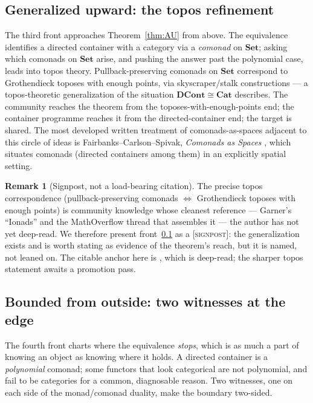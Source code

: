 \documentclass[11pt]{amsart}
\theoremstyle{plain}
\theoremstyle{definition}
\newtheorem{remark}[theorem]{Remark}
\newcommand{\Set}{\mathbf{Set}}
\newcommand{\Cat}{\mathbf{Cat}}
\newcommand{\DCont}{\mathbf{DCont}}
\newcommand{\iso}{\cong}
\newcommand{\gSignpost}{\textsc{[signpost]}}
\begin{document}
\subsection{Generalized upward: the topos refinement}\label{sub:up}

The third front approaches Theorem~\ref{thm:AU} from above. The equivalence identifies a
directed container with a category via a \emph{comonad} on $\Set$; asking which comonads on
$\Set$ arise, and pushing the answer past the polynomial case, leads into topos theory.
Pullback-preserving comonads on $\Set$ correspond to Grothendieck toposes with enough points,
via skyscraper/stalk constructions --- a topos-theoretic generalization of the situation
$\DCont\iso\Cat$ describes. The community reaches the theorem from the toposes-with-enough-points
end; the container programme reaches it from the directed-container end; the target is shared.
The most developed written treatment of comonads-as-spaces adjacent to this circle of ideas is
Fairbanks--Carlson--Spivak, \emph{Comonads as Spaces} \cite{ComonadsAsSpaces}, which situates
comonads (directed containers among them) in an explicitly spatial setting.

\begin{remark}[Signpost, not a load-bearing citation]
The precise topos correspondence (pullback-preserving comonads $\iff$ Grothendieck toposes with
enough points) is community knowledge whose cleanest reference --- Garner's ``Ionads'' and the
MathOverflow thread that assembles it --- the author has not yet deep-read. We therefore present
front~\ref{sub:up} as a \gSignpost: the generalization exists and is worth stating as evidence of
the theorem's reach, but it is named, not leaned on. The citable anchor here is
\cite{ComonadsAsSpaces}, which is deep-read; the sharper topos statement awaits a promotion pass.
\end{remark}

\subsection{Bounded from outside: two witnesses at the edge}\label{sub:boundary}

The fourth front charts where the equivalence \emph{stops}, which is as much a part of knowing an
object as knowing where it holds. A directed container is a \emph{polynomial} comonad; some
functors that look categorical are not polynomial, and fail to be categories for a common,
diagnosable reason. Two witnesses, one on each side of the monad/comonad duality, make the
boundary two-sided.
\end{document}
